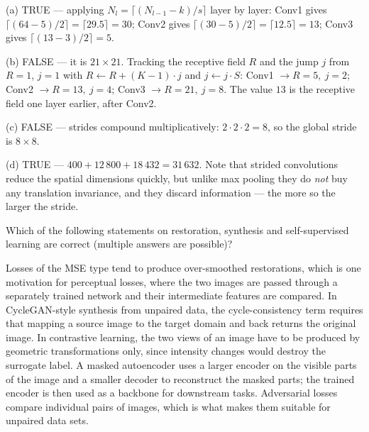 \documentclass[11pt]{exam}
\newcommand{\TFT}{\ifprintanswers\textbf{TRUE}\hspace{1.1em}False\else True\hspace{1.1em}False\fi}
\begin{document}
\begin{questions}

\begin{solution}
  (a) TRUE --- applying $N_l = \lceil (N_{l-1} - k)/s \rceil$ layer by layer:
  Conv1 gives $\lceil (64-5)/2 \rceil = \lceil 29.5 \rceil = 30$;
  Conv2 gives $\lceil (30-5)/2 \rceil = \lceil 12.5 \rceil = 13$;
  Conv3 gives $\lceil (13-3)/2 \rceil = 5$.

  (b) FALSE --- it is $21 \times 21$. Tracking the receptive field $R$ and the jump $j$ from
  $R = 1$, $j = 1$ with $R \leftarrow R + (K-1)\cdot j$ and $j \leftarrow j \cdot S$:
  Conv1 $\rightarrow R = 5,\ j = 2$; Conv2 $\rightarrow R = 13,\ j = 4$;
  Conv3 $\rightarrow R = 21,\ j = 8$. The value $13$ is the receptive field one layer earlier,
  after Conv2.

  (c) FALSE --- strides compound multiplicatively: $2 \cdot 2 \cdot 2 = 8$, so the global stride
  is $8 \times 8$.

  (d) TRUE --- $400 + 12\,800 + 18\,432 = 31\,632$. Note that strided convolutions reduce the
  spatial dimensions quickly, but unlike max pooling they do \emph{not} buy any translation
  invariance, and they discard information --- the more so the larger the stride.
\end{solution}

\question
Which of the following statements on restoration, synthesis and self-supervised learning are
correct (multiple answers are possible)?

\begin{choices}
  \choice Losses of the MSE type tend to produce over-smoothed restorations, which is one
  motivation for perceptual losses, where the two images are passed through a separately trained
  network and their intermediate features are compared.
  \choice In CycleGAN-style synthesis from unpaired data, the cycle-consistency term requires that
  mapping a source image to the target domain and back returns the original image.
  \choice In contrastive learning, the two views of an image have to be produced by geometric
  transformations only, since intensity changes would destroy the surrogate label.
  \choice A masked autoencoder uses a larger encoder on the visible parts of the image and a
  smaller decoder to reconstruct the masked parts; the trained encoder is then used as a backbone
  for downstream tasks.
  \choice Adversarial losses compare individual pairs of images, which is what makes them suitable
  for unpaired data sets.
\end{choices}


\end{questions}
\end{document}
